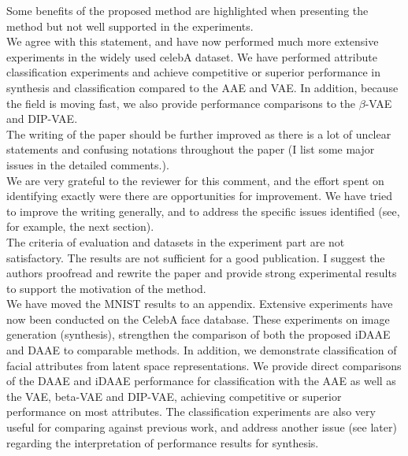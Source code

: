 \documentclass[a4paper,11pt]{article}
\begin{document}
{\color{blue} Some benefits of the proposed method are highlighted when presenting the method but not well supported in the experiments. }\\

We agree with this statement, and have now performed much more extensive experiments in the widely used celebA dataset. We have performed attribute classification experiments and achieve competitive or superior performance in synthesis and classification compared to the AAE and VAE. In addition, because the field is moving fast, we also provide performance comparisons to the $\beta$-VAE and DIP-VAE.\\


{\color{blue} The writing of the paper should be further improved as there is a lot of unclear statements and confusing notations throughout the paper (I list some major issues in the detailed comments.).} \\

We are very grateful to the reviewer for this comment, and the effort spent on identifying exactly were there are opportunities for improvement. We have tried to improve the writing generally, and to address the specific issues identified (see, for example, the next section). \\

{\color{blue} The criteria of evaluation and datasets in the experiment part are not satisfactory. The results are not sufficient for a good publication. I suggest the authors proofread and rewrite the paper and provide strong experimental results to support the motivation of the method.}\\

We have moved the MNIST results to an appendix. Extensive experiments have now been conducted on the CelebA face database. These experiments on image generation (synthesis), strengthen the comparison of both the proposed iDAAE and DAAE to comparable methods. In addition, we demonstrate classification of facial attributes from latent space representations. We provide direct comparisons of the DAAE and iDAAE performance for classification with the AAE as well as the VAE, beta-VAE and DIP-VAE, achieving competitive or superior performance on most attributes. The classification experiments are also very useful for comparing against previous work, and address another issue (see later) regarding the interpretation of performance results for synthesis.\\
\end{document}
